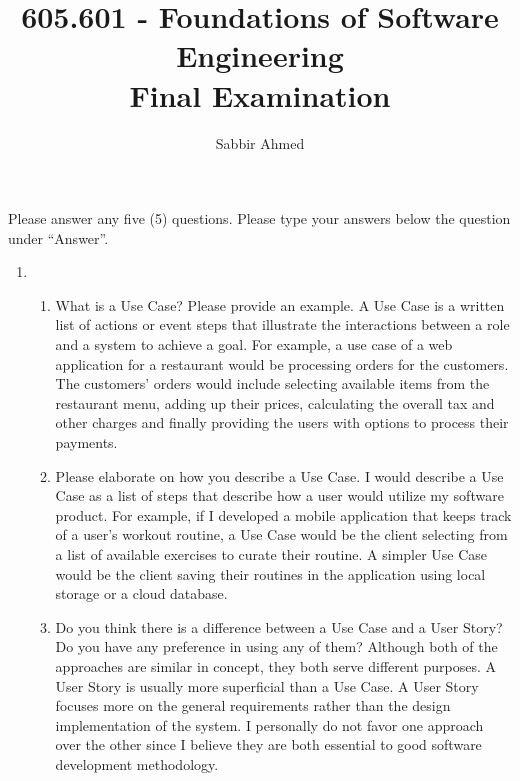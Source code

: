 \documentclass[12pt]{article}
\begin{document}
  \title{605.601 - Foundations of Software Engineering \\ Final Examination\vspace{-0.5em}}
  \author{Sabbir Ahmed}
  \maketitle
  \vspace{-5em}

  \section*{} Please answer any five (5) questions. Please type your answers below the question under ``Answer''.

  \begin{enumerate}

    \item
    \begin{enumerate}[start=1,align=left]
      \item What is a Use Case? Please provide an example.
      A Use Case is a written list of actions or event steps that illustrate the interactions between a role and a system to achieve a goal. For example, a use case of a web application for a restaurant would be processing orders for the customers. The customers' orders would include selecting available items from the restaurant menu, adding up their prices, calculating the overall tax and other charges and finally providing the users with options to process their payments.

      \item Please elaborate on how you describe a Use Case.
      I would describe a Use Case as a list of steps that describe how a user would utilize my software product. For example, if I developed a mobile application that keeps track of a user's workout routine, a Use Case would be the client selecting from a list of available exercises to curate their routine. A simpler Use Case would be the client saving their routines in the application using local storage or a cloud database.

      \item Do you think there is a difference between a Use Case and a User Story? Do you have any preference in using any of them?
      Although both of the approaches are similar in concept, they both serve different purposes. A User Story is usually more superficial than a Use Case. A User Story focuses more on the general requirements rather than the design implementation of the system. I personally do not favor one approach over the other since I believe they are both essential to good software development methodology.


\end{enumerate}
\end{enumerate}
\end{document}
